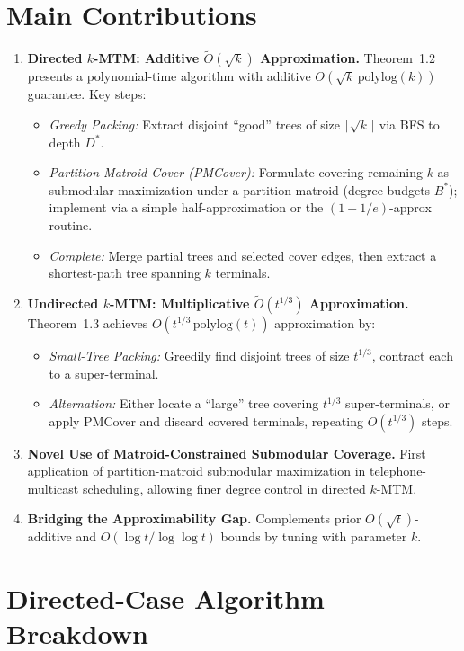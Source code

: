 \documentclass[12pt]{article}
\begin{document}
\section{Main Contributions}
\begin{enumerate}
  \item \textbf{Directed $k$-MTM: Additive $\tilde O(\sqrt{k})$ Approximation.}  
  Theorem~1.2 presents a polynomial-time algorithm with additive $O(\sqrt{k}\,\mathrm{polylog}(k))$ guarantee. Key steps:
  \begin{itemize}
    \item \emph{Greedy Packing:} Extract disjoint “good” trees of size $\lceil\sqrt{k}\rceil$ via BFS to depth $D^*$.  
    \item \emph{Partition Matroid Cover (PMCover):} Formulate covering remaining $k$ as submodular maximization under a partition matroid (degree budgets $B^*$); implement via a simple half-approximation or the $(1-1/e)$-approx routine.
    \item \emph{Complete:} Merge partial trees and selected cover edges, then extract a shortest-path tree spanning $k$ terminals.
  \end{itemize}

  \item \textbf{Undirected $k$-MTM: Multiplicative $\tilde O(t^{1/3})$ Approximation.}  
  Theorem~1.3 achieves $O(t^{1/3}\,\mathrm{polylog}(t))$ approximation by:
  \begin{itemize}
    \item \emph{Small-Tree Packing:} Greedily find disjoint trees of size $t^{1/3}$, contract each to a super-terminal.
    \item \emph{Alternation:} Either locate a “large” tree covering $t^{1/3}$ super-terminals, or apply PMCover and discard covered terminals, repeating $O(t^{1/3})$ steps.
  \end{itemize}

  \item \textbf{Novel Use of Matroid-Constrained Submodular Coverage.}  
  First application of partition-matroid submodular maximization in telephone-multicast scheduling, allowing finer degree control in directed $k$-MTM.

  \item \textbf{Bridging the Approximability Gap.}  
  Complements prior $O(\sqrt{t})$-additive and $O(\log t/\log\log t)$ bounds by tuning with parameter $k$.
\end{enumerate}

\section{Directed-Case Algorithm Breakdown}
\end{document}
